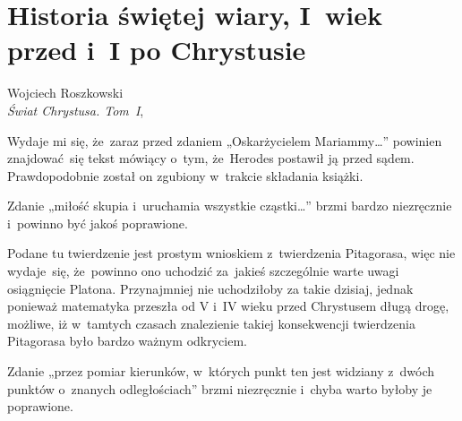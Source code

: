 \documentclass[a4paper,11pt]{article}
\numberwithin{equation}{section}
\begin{document}
\newpage

\section{Historia świętej wiary, I~wiek przed i~I po Chrystusie}




{ %
  Wojciech Roszkowski \\
  \textit{Świat Chrystusa. Tom~I}, \cite{RoszkowskiSwiatChrystusVolI2016}}

\vspace{0em}



\vspace{0em}


\noindent
{} Wydaje mi się, że~zaraz przed zdaniem
„Oskarżycielem Mariammy\ldots” powinien znajdować~się tekst mówiący
o~tym, że~Herodes postawił ją przed sądem. Prawdopodobnie został on
zgubiony w~trakcie składania książki.

\VerSpaceFour





\noindent
{} Zdanie „miłość skupia i~uruchamia wszystkie cząstki\ldots”
brzmi bardzo niezręcznie i~powinno być jakoś poprawione.

\VerSpaceFour





\noindent
{} Podane tu twierdzenie jest prostym wnioskiem
z~twierdzenia Pitagorasa, więc nie wydaje~się, że~powinno ono uchodzić
za~jakieś
szczególnie warte uwagi osiągnięcie Platona. Przynajmniej nie uchodziłoby
za takie dzisiaj, jednak ponieważ matematyka przeszła od V i~IV wieku przed
Chrystusem długą drogę, możliwe, iż w~tamtych czasach znalezienie takiej
konsekwencji twierdzenia Pitagorasa było bardzo ważnym odkryciem.

\VerSpaceFour





\noindent
{} Zdanie „przez pomiar kierunków, w~których punkt ten
jest widziany z~dwóch punktów o~znanych odległościach” brzmi niezręcznie
i~chyba warto byłoby je poprawione.
\end{document}
